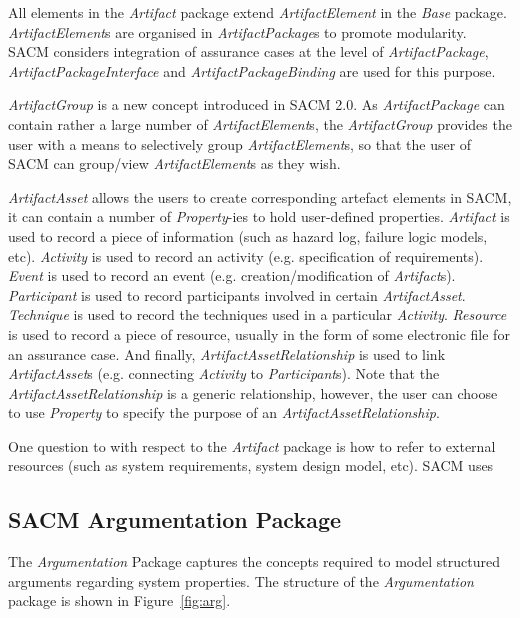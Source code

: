 All elements in the \textit{Artifact} package extend \textit{ArtifactElement} in the \textit{Base} package. \textit{ArtifactElement}s are organised in \textit{ArtifactPackage}s to promote modularity. SACM considers integration of assurance cases at the level of \textit{ArtifactPackage}, \textit{ArtifactPackageInterface} and \textit{ArtifactPackageBinding} are used for this purpose.

\textit{ArtifactGroup} is a new concept introduced in SACM 2.0. As \textit{ArtifactPackage} can contain rather a large number of \textit{ArtifactElement}s, the \textit{ArtifactGroup} provides the user with a means to selectively group \textit{ArtifactElement}s, so that the user of SACM can group/view \textit{ArtifactElement}s as they wish.

\textit{ArtifactAsset} allows the users to create corresponding artefact elements in SACM, it can contain a number of \textit{Property}-ies to hold user-defined properties. \textit{Artifact} is used to record a piece of information (such as hazard log, failure logic models, etc). \textit{Activity} is used to record an activity (e.g. specification of requirements). \textit{Event} is used to record an event (e.g. creation/modification of \textit{Artifact}s). \textit{Participant} is used to record participants involved in certain \textit{ArtifactAsset}. \textit{Technique} is used to record the techniques used in a particular \textit{Activity}. \textit{Resource} is used to record a piece of resource, usually in the form of some electronic file for an assurance case. And finally, \textit{ArtifactAssetRelationship} is used to link \textit{ArtifactAsset}s (e.g. connecting \textit{Activity} to \textit{Participant}s). Note that the \textit{ArtifactAssetRelationship} is a generic relationship, however, the user can choose to use \textit{Property} to specify the purpose of an \textit{ArtifactAssetRelationship}. 

One question to with respect to the \textit{Artifact} package is how to refer to external resources (such as system requirements, system design model, etc). SACM uses  

\subsection{SACM Argumentation Package}
\label{sec:argPack}
The \textit{Argumentation} Package captures the concepts required to model structured arguments regarding system properties. The structure of the \textit{Argumentation} package is shown in Figure~\ref{fig:arg}. 

